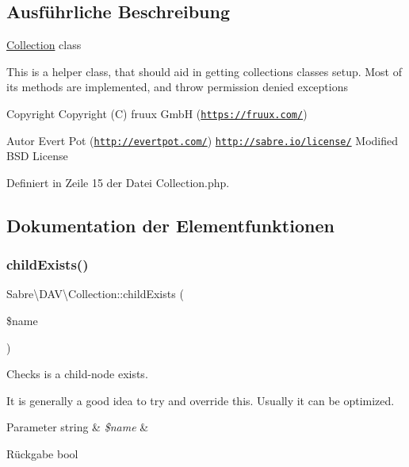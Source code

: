 \subsection{Ausführliche Beschreibung}
\mbox{\hyperlink{class_sabre_1_1_d_a_v_1_1_collection}{Collection}} class

This is a helper class, that should aid in getting collections classes setup. Most of its methods are implemented, and throw permission denied exceptions

\begin{DoxyCopyright}{Copyright}
Copyright (C) fruux GmbH (\href{https://fruux.com/}{\tt https\+://fruux.\+com/}) 
\end{DoxyCopyright}
\begin{DoxyAuthor}{Autor}
Evert Pot (\href{http://evertpot.com/}{\tt http\+://evertpot.\+com/})  \href{http://sabre.io/license/}{\tt http\+://sabre.\+io/license/} Modified B\+SD License 
\end{DoxyAuthor}


Definiert in Zeile 15 der Datei Collection.\+php.



\subsection{Dokumentation der Elementfunktionen}
\mbox{\label{class_sabre_1_1_d_a_v_1_1_collection_ae51aca8bc4fecd69064bdd0cf2cda6fa}} 
\subsubsection{\texorpdfstring{child\+Exists()}{childExists()}}
{\footnotesize\ttfamily Sabre\textbackslash{}\+D\+A\+V\textbackslash{}\+Collection\+::child\+Exists (\begin{DoxyParamCaption}\item[{}]{\$name }\end{DoxyParamCaption})}

Checks is a child-\/node exists.

It is generally a good idea to try and override this. Usually it can be optimized.


\begin{DoxyParams}[1]{Parameter}
string & {\em \$name} & \\
\hline
\end{DoxyParams}
\begin{DoxyReturn}{Rückgabe}
bool 
\end{DoxyReturn}


